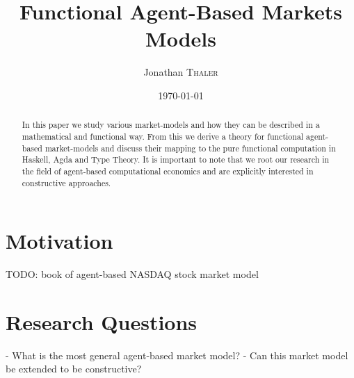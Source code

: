 \documentclass{article}
\title{Functional Agent-Based Markets Models} %
\author{Jonathan \textsc{Thaler}} %
\date{\today} %
\begin{document}
\maketitle %

\begin{abstract}
In this paper we study various market-models and how they can be described in a mathematical and functional way. From this we derive a theory for functional agent-based market-models and discuss their mapping to the pure functional computation in Haskell, Agda and Type Theory. It is important to note that we root our research in the field of agent-based computational economics and are explicitly interested in constructive approaches.
\end{abstract}

\section{Motivation}
TODO: book of agent-based NASDAQ stock market model

\cite{tesfatsion_agent-based_2006}

\section{Research Questions}
- What is the most general agent-based market model?
- Can this market model be extended to be constructive?



\end{document}
